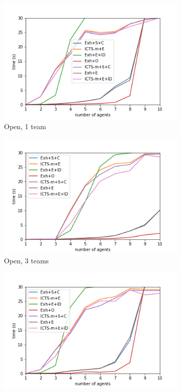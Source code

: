\documentclass[english]{article}
\begin{document}
	\begin{figure}
		\centering
		\begin{subfigure}{0.49\textwidth}
			\centering
			\includegraphics[width=\linewidth]{img/results/open-1}
			\caption{Open, 1 team}
			\label{fig:open1}
		\end{subfigure}
		\begin{subfigure}{0.49\textwidth}
		\centering
		\includegraphics[width=\linewidth]{img/results/open-3}
		\caption{Open, 3 teams}
		\label{fig:open3}
		\end{subfigure}
		\begin{subfigure}{0.49\textwidth}
			\centering
			\includegraphics[width=\linewidth]{img/results/obstacle-1}

\end{subfigure}
\end{figure}
\end{document}
